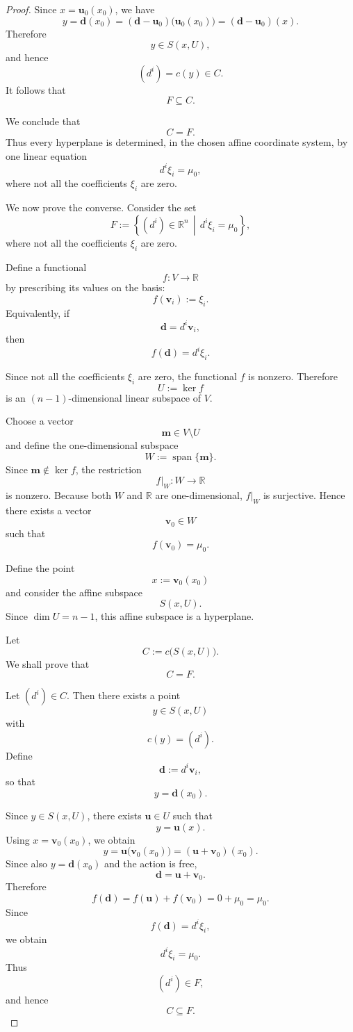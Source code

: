\documentclass[12pt]{article}
\begin{document}
\begin{proof}
Since $x=\mathbf u_0(x_0)$, we have
\[
y
 =\mathbf d(x_0)
 =(\mathbf d-\mathbf u_0)\bigl(\mathbf u_0(x_0)\bigr)
 =(\mathbf d-\mathbf u_0)(x).
\]
Therefore
\[
y\in S(x,U),
\]
and hence
\[
(d^i)=c(y)\in C.
\]
It follows that
\[
F\subseteq C.
\]

We conclude that
\[
C=F.
\]
Thus every hyperplane is determined, in the chosen affine coordinate system,
by one linear equation
\[
d^i\xi_i=\mu_0,
\]
where not all the coefficients $\xi_i$ are zero.

We now prove the converse. Consider the set
\[
F:=\left\{(d^i)\in\mathbb R^n
          \,\middle|\,
          d^i\xi_i=\mu_0
   \right\},
\]
where not all the coefficients $\xi_i$ are zero.

Define a functional
\[
f:V\longrightarrow\mathbb R
\]
by prescribing its values on the basis:
\[
f(\mathbf v_i):=\xi_i.
\]
Equivalently, if
\[
\mathbf d=d^i\mathbf v_i,
\]
then
\[
f(\mathbf d)=d^i\xi_i.
\]

Since not all the coefficients $\xi_i$ are zero, the functional $f$ is
nonzero. Therefore
\[
U:=\ker f
\]
is an $(n-1)$-dimensional linear subspace of $V$.

Choose a vector
\[
\mathbf m\in V\setminus U
\]
and define the one-dimensional subspace
\[
W:=\operatorname{span}\{\mathbf m\}.
\]
Since $\mathbf m\notin\ker f$, the restriction
\[
f|_W:W\longrightarrow\mathbb R
\]
is nonzero. Because both $W$ and $\mathbb R$ are one-dimensional,
$f|_W$ is surjective. Hence there exists a vector
\[
\mathbf v_0\in W
\]
such that
\[
f(\mathbf v_0)=\mu_0.
\]

Define the point
\[
x:=\mathbf v_0(x_0)
\]
and consider the affine subspace
\[
S(x,U).
\]
Since $\dim U=n-1$, this affine subspace is a hyperplane.

Let
\[
C:=c\bigl(S(x,U)\bigr).
\]
We shall prove that
\[
C=F.
\]

Let $(d^i)\in C$. Then there exists a point
\[
y\in S(x,U)
\]
with
\[
c(y)=(d^i).
\]
Define
\[
\mathbf d:=d^i\mathbf v_i,
\]
so that
\[
y=\mathbf d(x_0).
\]

Since $y\in S(x,U)$, there exists $\mathbf u\in U$ such that
\[
y=\mathbf u(x).
\]
Using $x=\mathbf v_0(x_0)$, we obtain
\[
y
 =\mathbf u\bigl(\mathbf v_0(x_0)\bigr)
 =(\mathbf u+\mathbf v_0)(x_0).
\]
Since also $y=\mathbf d(x_0)$ and the action is free,
\[
\mathbf d=\mathbf u+\mathbf v_0.
\]
Therefore
\[
f(\mathbf d)
 =f(\mathbf u)+f(\mathbf v_0)
 =0+\mu_0
 =\mu_0.
\]
Since
\[
f(\mathbf d)=d^i\xi_i,
\]
we obtain
\[
d^i\xi_i=\mu_0.
\]
Thus
\[
(d^i)\in F,
\]
and hence
\[
C\subseteq F.
\]


\end{proof}
\end{document}
